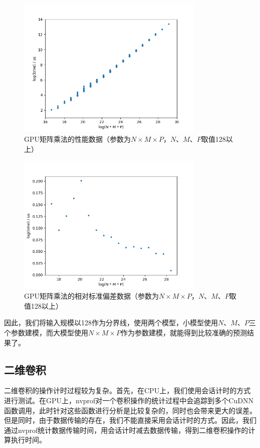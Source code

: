     \begin{figure}[!htbp]
        \centering
        \includegraphics[width=0.8\textwidth]{figures/matmul_gpu_nmp_big.png}
        \caption{GPU矩阵乘法的性能数据（参数为$N \times M \times P $，$ N $、$ M $、$ P $取值128以上）}
        \label{fig:matmul_gpu_nmp_big}
    \end{figure}

    \begin{figure}[!htbp]
        \centering
        \includegraphics[width=0.8\textwidth]{figures/matmul_gpu_nmp_rsd_big.png}
        \caption{GPU矩阵乘法的相对标准偏差数据（参数为$ N \times M \times P $，$ N $、$ M $、$ P $取值128以上）}
        \label{fig:matmul_gpu_nmp_rsd_big}
    \end{figure}

    因此，我们将输入规模以128作为分界线，使用两个模型，小模型使用$ N $、$ M $、$ P $三个参数建模，而大模型使用$ N \times M \times P $作为参数建模，就能得到比较准确的预测结果了。

\subsection{二维卷积}
\label{ssec:impl_conv}
    二维卷积的操作计时过程较为复杂。首先，在CPU上，我们使用会话计时的方式进行测试。在GPU上，nvprof对一个卷积操作的统计过程中会追踪到多个CuDNN函数调用，此时针对这些函数进行分析是比较复杂的，同时也会带来更大的误差。但是同时，由于数据传输的存在，我们不能直接采用会话计时的方式。因此，我们通过nvprof统计数据传输时间，用会话计时减去数据传输，得到二维卷积操作的计算执行时间。

